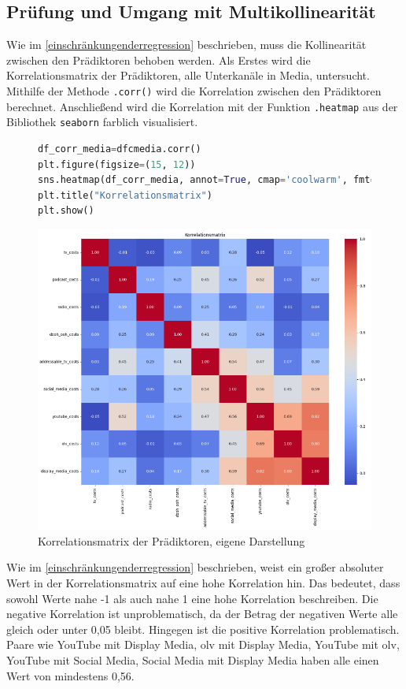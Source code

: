 \subsection{Prüfung und Umgang mit Multikollinearität}
\label{PrüfungUndUmgangMitMultikollinearität}
Wie im \autoref{einschränkungenderregression} beschrieben, muss die Kollinearität zwischen den Prädiktoren behoben werden. Als Erstes wird die Korrelationsmatrix der Prädiktoren, alle Unterkanäle in Media, untersucht. Mithilfe der Methode \verb|.corr()| wird die Korrelation zwischen den Prädiktoren berechnet. Anschließend wird die Korrelation mit der Funktion \verb|.heatmap| aus der Bibliothek \verb|seaborn| farblich visualisiert.
\begin{figure}[H]
    \centering
    \begin{lstlisting}[language=Python, linewidth=\textwidth]
df_corr_media=dfcmedia.corr() 
plt.figure(figsize=(15, 12))
sns.heatmap(df_corr_media, annot=True, cmap='coolwarm', fmt=".2f")
plt.title("Korrelationsmatrix")
plt.show()
\end{lstlisting}
    \includegraphics[width=0.9\linewidth]{images/korrelationsmatrix.png}
    \caption{Korrelationsmatrix der Prädiktoren, eigene Darstellung}
    \label{fig:korrelationsmatrix}
\end{figure}
Wie im \autoref{einschränkungenderregression} beschrieben, weist ein großer absoluter Wert in der Korrelationsmatrix auf eine hohe Korrelation hin. Das bedeutet, dass sowohl Werte nahe -1 als auch nahe 1 eine hohe Korrelation beschreiben. Die negative Korrelation ist unproblematisch, da der Betrag der negativen Werte alle gleich oder unter 0,05 bleibt. Hingegen ist die positive Korrelation problematisch. Paare wie YouTube mit Display Media, \ac{olv} mit Display Media, YouTube mit \ac{olv}, YouTube mit Social Media, Social Media mit Display Media haben alle einen Wert von mindestens 0,56. \\\\
